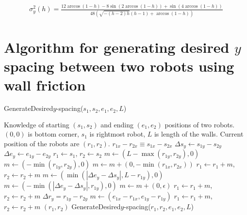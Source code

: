 \documentclass[conference]{IEEEtran}
\begin{document}
{\tiny
\begin{align}
\sigma_y^2(h)=
\frac{12 \arccos(1-h)-8 \sin \left(2 \arccos(1-h)\right)+\sin \left(4 \arccos(1-h)\right)}{48 \left(\sqrt{-(h-2) h} (h-1)+\arccos(1-h)\right)}
\end{align}}

\section{ Algorithm for generating desired $y$ spacing between two robots using wall friction}
\begin{algorithm}
\caption{GenerateDesired$y$-spacing($s_1,s_2,e_1,e_2,L$)}\label{alg:YControl}
\begin{algorithmic}[1]
\Require Knowledge of starting $(s_1,s_2)$ and ending $(e_1,e_2)$ positions of  two robots. 
$(0,0)$ is bottom corner, $s_1$ is rightmost robot, 
 $L$ is length of the walls. Current position of the robots are $(r_1,r_2)$.
\Ensure   $ r_{1x} - r_{2x}  \equiv s_{1x} - s_{2x} $   %
\State $ \Delta s_y  \gets s_{1y} - s_{2y} $
\State $ \Delta e_y \gets e_{1y} - e_{2y} $
\State $ r_1 \gets s_1$, $ r_2 \gets s_2$
\State $ m \gets ( L-\max( r_{1y},r_{2y}) ,0)   $ 
\Else 
\State  $ m \gets ( -\min( r_{1y},r_{2y}),0 )    $ 
\EndIf
\State $m  \gets  m + (0, -\min( r_{1x},r_{2x} ))$ 
\State $ r_1 \gets r_1+m$, $ r_2 \gets r_2+m$ 
\State $ m \gets (\min(|\Delta e_y - \Delta s_y |, L- r_{1y}), 0)$  
\Else
\State $ m \gets (-\min(|\Delta e_y - \Delta s_y |, r_{1y}), 0)$
\EndIf 
\State $m  \gets  m + (0, \epsilon)$ 
\State $ r_1 \gets r_1+m$, $ r_2 \gets r_2+m$ 
\State $\Delta r_y = r_{1y} - r_{2y}$
\State   $ m \gets (e_{1x}-r_{1x}, e_{1y}-r_{1y})$
\State $ r_1 \gets r_1+m$, $ r_2 \gets r_2+m$ 
\State  \Return $(r_1,r_2)$
\Else   
\State \Return GenerateDesired$y$-spacing($r_1,r_2,e_1,e_2,L$)
\EndIf
\end{algorithmic}
\end{algorithm}




\end{document}
